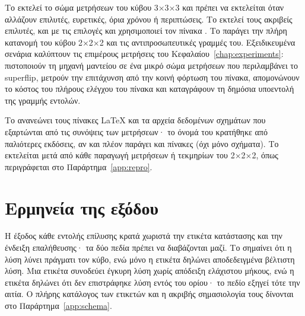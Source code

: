 Το  εκτελεί το σώμα μετρήσεων του κύβου 3×3×3 και πρέπει να εκτελείται όταν αλλάζουν επιλυτές, ευρετικές, όρια χρόνου ή περιπτώσεις. Το  εκτελεί τους ακριβείς επιλυτές, και με τις επιλογές  και  χρησιμοποιεί τον πίνακα . Το  παράγει την πλήρη κατανομή του κύβου 2×2×2 και τις αντιπροσωπευτικές γραμμές του. Εξειδικευμένα σενάρια καλύπτουν τις επιμέρους μετρήσεις του Κεφαλαίου~\ref{chap:experiments}: πιστοποιούν τη μηχανή μαντείου σε ένα μικρό σώμα μετρήσεων που περιλαμβάνει το superflip, μετρούν την επιτάχυνση από την κοινή φόρτωση του πίνακα, απομονώνουν το κόστος του πλήρους ελέγχου του πίνακα και καταγράφουν τη δημόσια υποεντολή  της γραμμής εντολών.

Το  ανανεώνει τους πίνακες LaTeX και τα αρχεία δεδομένων σχημάτων που εξαρτώνται από τις συνόψεις των μετρήσεων· το όνομά του κρατήθηκε από παλιότερες εκδόσεις, αν και πλέον παράγει και πίνακες (όχι μόνο σχήματα). Το  εκτελείται μετά από κάθε παραγωγή μετρήσεων ή τεκμηρίων του 2×2×2, όπως περιγράφεται στο Παράρτημα~\ref{app:repro}.

\section{Ερμηνεία της εξόδου}
\label{sec:cli-output}

Η έξοδος κάθε εντολής επίλυσης κρατά χωριστά την ετικέτα κατάστασης και την ένδειξη επαλήθευσης· τα δύο πεδία πρέπει να διαβάζονται μαζί. Το  σημαίνει ότι η λύση λύνει πράγματι τον κύβο, ενώ μόνο η ετικέτα  δηλώνει αποδεδειγμένα βέλτιστη λύση. Μια ετικέτα  συνοδεύει έγκυρη λύση χωρίς απόδειξη ελάχιστου μήκους, ενώ η ετικέτα  δηλώνει ότι δεν επιστράφηκε λύση εντός του ορίου· το πεδίο  εξηγεί τότε την αιτία. Ο πλήρης κατάλογος των ετικετών και η ακριβής σημασιολογία τους δίνονται στο Παράρτημα~\ref{app:schema}.
